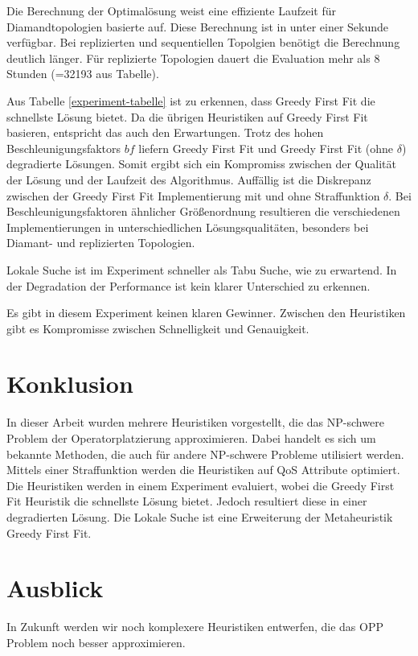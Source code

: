 \documentclass{article}
\begin{document}
Die Berechnung der Optimalösung weist eine effiziente Laufzeit für Diamandtopologien basierte auf. 
Diese Berechnung ist in unter einer Sekunde verfügbar. Bei replizierten und sequentiellen Topolgien benötigt die Berechnung deutlich länger. 
Für replizierte Topologien dauert die Evaluation mehr als 8 Stunden (=32193 aus Tabelle).

Aus Tabelle \ref{experiment-tabelle} ist zu erkennen, dass Greedy First Fit die schnellste Lösung bietet. 
Da die übrigen Heuristiken auf Greedy First Fit basieren, entspricht das auch den Erwartungen. 
Trotz des hohen Beschleunigungsfaktors $bf$ liefern Greedy First Fit und Greedy First Fit (ohne $\delta$) degradierte Lösungen. 
Somit ergibt sich ein Kompromiss zwischen der Qualität der Lösung und der Laufzeit des Algorithmus. 
Auffällig ist die Diskrepanz zwischen der Greedy First Fit Implementierung mit und ohne Straffunktion $\delta$. 
Bei Beschleunigungsfaktoren ähnlicher Größenordnung resultieren die verschiedenen Implementierungen 
in unterschiedlichen Lösungsqualitäten, besonders bei Diamant- und replizierten Topologien.

Lokale Suche ist im Experiment schneller als Tabu Suche, wie zu erwartend. 
In der Degradation der Performance ist kein klarer Unterschied zu erkennen.

Es gibt in diesem Experiment keinen klaren Gewinner. Zwischen den Heuristiken gibt es Kompromisse zwischen Schnelligkeit und Genauigkeit. 

\section{Konklusion}
In dieser Arbeit wurden mehrere Heuristiken vorgestellt, die das NP-schwere Problem der Operatorplatzierung approximieren. 
Dabei handelt es sich um bekannte Methoden, die auch für andere NP-schwere Probleme utilisiert werden. Mittels einer Straffunktion
werden die Heuristiken auf QoS Attribute optimiert. 
Die Heuristiken werden in einem Experiment evaluiert, wobei die Greedy First Fit Heuristik die schnellste Lösung bietet. 
Jedoch resultiert diese in einer degradierten Lösung. 
Die Lokale Suche ist eine Erweiterung der Metaheuristik Greedy First Fit.


\section{Ausblick}
In Zukunft werden wir noch komplexere Heuristiken entwerfen, die das OPP Problem noch besser approximieren. 

\newpage

\end{document}
